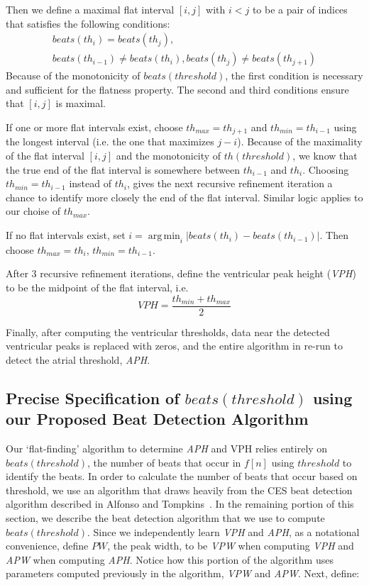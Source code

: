 \documentclass[conference]{IEEEtran}
\newcommand{\APW}{\textit{APW}}
\newcommand{\VPW}{\textit{VPW}}
\newcommand{\APH}{\textit{APH}}
\newcommand{\VPH}{\textit{VPH}}
\DeclareMathOperator*{\argmin}{arg\,min}
\begin{document}
Then we define a maximal flat interval $[i,j]$ with $i<j$ to be a pair of indices that satisfies the following conditions:
\begin{multline*}
	beats(th_i) = beats(th_j),\\ beats(th_{i-1}) \ne beats(th_i), beats(th_j) \ne beats(th_{j+1})
\end{multline*}
Because of the monotonicity of $beats(threshold)$, the first condition is necessary and sufficient for the flatness property.
The second and third conditions ensure that $[i,j]$ is maximal.

If one or more flat intervals exist, choose $th_{max} = th_{j+1}$ and $th_{min}=th_{i-1}$ using the longest interval (i.e. the one that maximizes $j-i$).
Because of the maximality of the flat interval $[i,j]$ and the monotonicity of $th(threshold)$, 
we know that the true end of the flat interval is somewhere between $th_{i-1}$ and $th_i$. 
Choosing $th_{min} = th_{i-1}$ instead of $th_{i}$, gives the next recursive refinement iteration a chance to identify more closely the end of the flat interval.
Similar logic applies to our choise of $th_{max}$.

If no flat intervals exist, set $i=\argmin_{i} |beats(th_i) - beats(th_{i-1})|$.
Then choose $th_{max} = th_i$, $th_{min} = th_{i-1}$.

After 3 recursive refinement iterations, define the ventricular peak height (\VPH{}) to be the midpoint of the flat interval, i.e.
\begin{equation*}
	VPH=\frac{th_{min}+th_{max}}{2}
\end{equation*}

Finally, after computing the ventricular thresholds,
data near the detected ventricular peaks is replaced with
zeros, and the entire algorithm in re-run to detect the
atrial threshold, \APH{}.

\subsection{Precise Specification of $beats(threshold)$ using our Proposed Beat Detection Algorithm}
Our `flat-finding' algorithm to determine \APH{} and
VPH relies entirely on $beats(threshold)$, 
the number of beats that occur in $f[n]$ using
$threshold$ to identify the beats. In order to calculate the
number of beats that occur based on threshold, we use
an algorithm that draws heavily from the CES beat
detection algorithm described in Alfonso and Tompkins~\cite{realtime-qrs}.
In the remaining portion of this section, we describe
the beat detection algorithm that we use to compute
$beats(threshold)$.
Since we independently learn \VPH{} and \APH{}, as a notational convenience, define $PW$, the peak width, to be \VPW{} when computing \VPH{} and \APW{} when computing \APH{}.
Notice how this portion of the algorithm uses parameters computed previously in the algorithm, \VPW{} and \APW{}.
Next, define:
\end{document}
